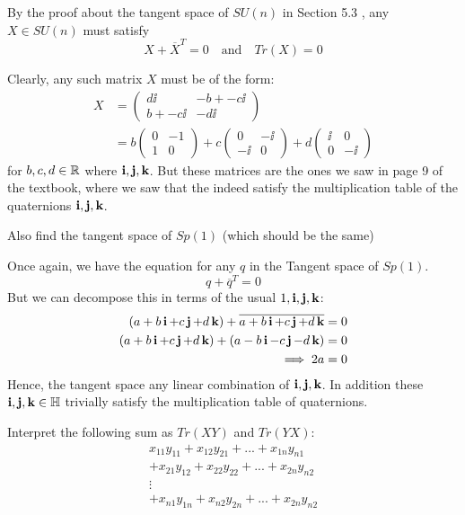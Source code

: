 \documentclass[12pt,onecolumn]{article}
\begin{document}
\begin{answer}
By the proof about the tangent space of $SU(n)$ in Section 5.3 , any $X \in SU(n)$ must satisfy
$$  X + \overline{X}^T = 0 \quad \text{and} \quad Tr(X) = 0$$

Clearly, any such matrix $X$ must be of the form:
\begin{align*}
    X &= \begin{pmatrix} d\ii & -b + -c\ii \\ b + -c\ii & -d\ii \end{pmatrix} \\
    &= b \begin{pmatrix} 0 & -1 \\ 1 & 0 \end{pmatrix} + c \begin{pmatrix} 0 & -\ii \\ -\ii & 0 \end{pmatrix} + d \begin{pmatrix} \ii & 0 \\ 0 & -\ii \end{pmatrix}
\end{align*}
for $b,c,d \in \operatorname{\mathbb{R}}$ where $\operatorname{\textbf{i}},\operatorname{\textbf{j}},\operatorname{\textbf{k}}$. But these matrices are the ones we saw in page 9 of the textbook, where we saw that the indeed satisfy the multiplication table of the quaternions $\operatorname{\textbf{i}}, \operatorname{\textbf{j}}, \operatorname{\textbf{k}}$.
\end{answer}
\begin{exercise}
Also find the tangent space of $Sp(1)$ (which should be the same)
\end{exercise}
\begin{answer}
Once again, we have the equation for any $q$ in the Tangent space of $Sp(1)$.
$$ q + \overline{q}^T = 0$$
But we can decompose this in terms of the usual $1, \operatorname{\textbf{i}},\operatorname{\textbf{j}},\operatorname{\textbf{k}}$:
\begin{align*}
    (a + b\operatorname{\textbf{i}} + c\operatorname{\textbf{j}} + d\operatorname{\textbf{k}}) + \overline{a + b\operatorname{\textbf{i}} + c\operatorname{\textbf{j}} + d\operatorname{\textbf{k}}} &= 0 \\
    (a+b\operatorname{\textbf{i}} + c\operatorname{\textbf{j}} +d\operatorname{\textbf{k}}) + (a-b\operatorname{\textbf{i}} -c\operatorname{\textbf{j}}-d\operatorname{\textbf{k}}) &= 0\\
    \implies 2a &= 0\\
\end{align*}
Hence, the tangent space any linear combination of $\operatorname{\textbf{i}},\operatorname{\textbf{j}},\operatorname{\textbf{k}}$. In addition these $\operatorname{\textbf{i}},\operatorname{\textbf{j}},\operatorname{\textbf{k}} \in \mathbb{H}$ trivially satisfy the multiplication table of quaternions.
\end{answer}
\begin{exercise}
Interpret the following sum as $Tr(XY)$ and $Tr(YX)$:
\begin{align*}
      x_{11}y_{11} +  x_{12}y_{21} + ... +  x_{1n}y_{n1}\\
    + x_{21}y_{12} +  x_{22}y_{22} + ... +  x_{2n}y_{n2}\\
    \vdots \quad \\
    + x_{n1}y_{1n} +  x_{n2}y_{2n} + ... +  x_{2n}y_{n2}
\end{align*}
\end{exercise}
\end{document}
